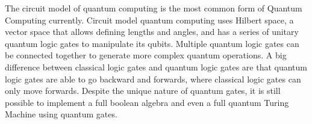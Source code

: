\documentclass[sigconf]{acmart}
\begin{document}
The circuit model of quantum computing is the most common form of Quantum Computing currently. Circuit model quantum computing uses Hilbert space, a vector space that allows defining lengths and angles, and has a series of unitary quantum logic gates to manipulate its qubits. Multiple quantum logic gates can be connected together to generate more complex quantum operations. A big difference between classical logic gates and quantum logic gates are that quantum logic gates are able to go backward and forwards, where classical logic gates can only move forwards. Despite the unique nature of quantum gates, it is still possible to implement a full boolean algebra and even a full quantum Turing Machine using quantum gates\cite{rieffel_introduction_1998}.

\end{document}

